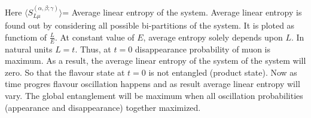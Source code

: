\documentclass[12pt,a4paper]{report}
\begin{document}
Here $\langle S^{(\alpha,\beta;\gamma)}_{L\mu}\rangle$= Average linear entropy of the system. Average linear entropy is found out by considering all possible bi-partitions of the system. It is ploted as functiom of $\frac{L}{E}$. At constant value of $E$, average entropy solely depends upon $L$. In natural units $L=t$. Thus, at $t=0$ disappearance probability of muon is maximum. As a result, the average linear entropy of the system of the system will zero. So that the flavour state at $t=0$ is not entangled (product state). Now as time progres flavour oscillation happens and as result average linear entropy will vary. The global entanglement will be maximum when all oscillation probabilities (appearance and disappearance) together maximized.  

\printindex
\end{document}
